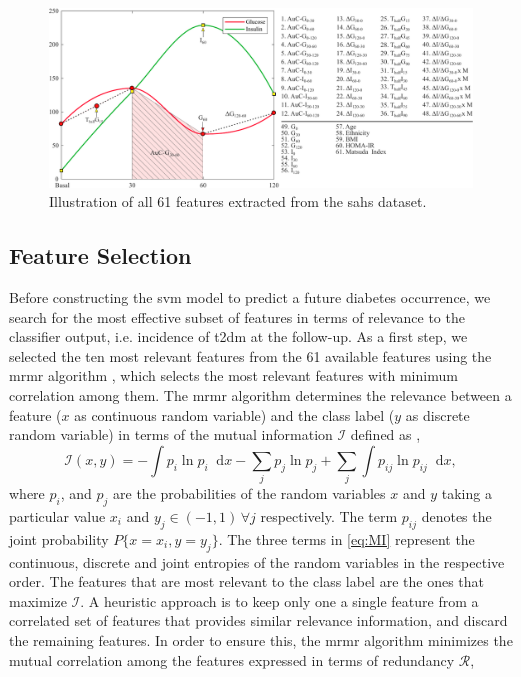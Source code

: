 \documentclass[journal,comsoc]{IEEEtran}
\renewcommand{\^}{\hat}  %
\newcommand*\diff{\mathop{}\!\mathrm{d}} %
\begin{document}
%
\begin{figure}[t!]
  \centering
  \includegraphics[width=.95\linewidth]{features_define_text.pdf}
  \caption{Illustration of all \num{61} features extracted from the \ac{sahs} dataset.}
  \label{fig:features}
\end{figure}
%
%
%
%
\subsection{Feature Selection}
%
Before constructing the \ac{svm} model to predict a future diabetes occurrence, we search for the most effective subset of features in terms of relevance to the classifier output, i.e. incidence of \ac{t2dm} at the follow-up. As a first step, we selected the ten most relevant features from the \num{61} available features using the \ac{mrmr} algorithm \cite{mRMR}, which selects the most relevant features with minimum correlation among them. The \ac{mrmr} algorithm determines the relevance between a feature ($x$ as continuous random variable) and the class label ($y$ as discrete random variable) in terms of the mutual information $\mathcal I$ defined as \cite{ross2014mutual},
%
\begin{equation}
  \mathcal I(x, y) = - \int p_i \ln p_i \diff x - \sum \limits_j p_j\ln p_j + \sum_j \int p_{ij}\ln p_{ij} \diff x,
  \label{eq:MI}
\end{equation}
%
where $p_{i}$, and $p_{j}$ are the probabilities of the random variables $x$ and $y$ taking a particular value $x_i$ and $y_j \in (-1,1) \, \forall j$ respectively. The term $p_{ij}$ denotes the joint probability $P\{x= x_i, y=y_j\}$. The three terms in \eqref{eq:MI} represent the continuous, discrete and joint entropies of the random variables in the respective order. The features that are most relevant to the class label are the ones that maximize $\mathcal I$. A heuristic approach is to keep only one a single feature from a correlated set of features that provides similar relevance information, and discard the remaining features. In order to ensure this, the \ac{mrmr} algorithm minimizes the mutual correlation among the features expressed in terms of redundancy $\mathcal R$,
\end{document}

